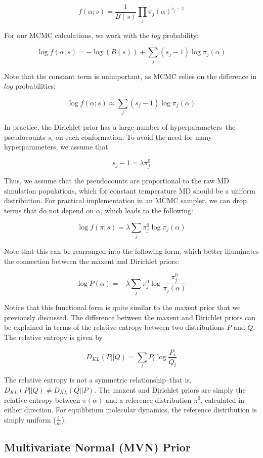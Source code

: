 \documentclass[12pt]{article}
\begin{document}
$$f(\alpha;s) = \frac{1}{B(s)} \prod_j \pi_j(\alpha)^{s_j - 1}$$

For our MCMC calculations, we work with the $log$ probability:

$$\log f(\alpha;s) = -\log(B(s)) + \sum_j (s_j - 1) \log \pi_j(\alpha)$$

Note that the constant term is unimportant, as MCMC relies on the difference in $log$ probabilities:

$$\log f(\alpha;s) \approx \sum_j (s_j - 1) \log \pi_j(\alpha)$$

In practice, the Dirichlet prior has a large number of hyperparameters--the pseudocounts $s_i$ on each conformation.  To avoid the need for many hyperparameters, we assume that 

$$s_j - 1 = \lambda \pi_j^0$$

Thus, we assume that the pseudocounts are proportional to the raw MD simulation populations, which for constant temperature MD should be a uniform distribution.  For practical implementation in an MCMC sampler, we can drop terms that do not depend on $\alpha$, which leads to the following:

$$\log f(\pi;s) =  \lambda \sum_j \pi_j^0 \log \pi_j(\alpha)$$

Note that this can be rearranged into the following form, which better illuminates the connection between the maxent and Dirichlet priors:

$$\log P(\alpha) = -\lambda \sum_j \pi_j^0 \log \frac{\pi_j^0}{\pi_j(\alpha)}$$

Notice that this functional form is quite similar to the maxent prior that we previously discussed.  The difference between the maxent and Dirichlet priors can be explained in terms of the relative entropy between two distributions $P$ and $Q$.  The relative entropy is given by

$$D_{KL}(P||Q) = \sum_i P_i \log \frac{P_i}{Q_i}$$

The relative entropy is not a symmetric relationship--that is, $D_{KL}(P||Q) \ne D_{KL}(Q||P)$.  The maxent and Dirichlet priors are simply the relative entropy between $\pi(\alpha)$ and a reference distribution $\pi^0$, calculated in either direction.    For equilibrium molecular dynamics, the reference distribution is simply uniform ($\frac{1}{m}$).


\subsection*{Multivariate Normal (MVN) Prior}
\end{document}
